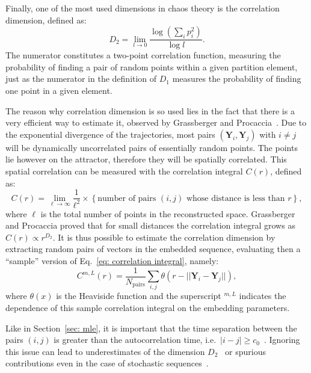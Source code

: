 Finally, one of the most used dimensions in chaos theory is the correlation dimension, defined as:
\begin{equation}
    \label{eq: D_2}
    D_2=\lim_{l\rightarrow0}\frac{\log(\sum_i p_i^2)}{\log l}.
\end{equation}
The numerator constitutes a two-point correlation function, measuring the probability of finding a
pair of random points within a given partition element, just as the numerator in the definition of
$D_1$ measures the probability of finding one point in a given element.

The reason why correlation dimension is so used lies in the fact that there is a very
efficient way to estimate it, observed by Grassberger and Procaccia~\cite{ref:grassberger1983measuring}.
Due to the exponential divergence of the trajectories, most pairs
$(\mathbf{Y}_i,\mathbf{Y}_j)$ with $i\neq j$ will be dynamically uncorrelated
pairs of essentially random points. The points lie however on the attractor, therefore they will be
spatially correlated. This spatial correlation can be measured with the correlation integral
$C(r)$, defined as:
\begin{equation}
    \label{eq: correlation integral}
    C(r) = \lim_{\ell\rightarrow\infty} \frac{1}{\ell^2}\times\left\{
        \text{number of pairs $(i,j)$ whose distance is less than $r$}
    \right\},
\end{equation}
where $\ell$ is the total number of points in the reconstructed space.
Grassberger and Procaccia proved that for small distances the correlation integral grows as
$C(r)\propto r^{D_2}$. It is thus possible to estimate the correlation dimension
by extracting random pairs of vectors in the embedded sequence, evaluating then a ``sample''
version of Eq.~\ref{eq: correlation integral}, namely:
\begin{equation}
    \label{eq: sample correlation integral}
    C^{m,L}(r)=\frac{1}{N_{\text{pairs}}}\sum_{i,j}\theta\left(
        r-||\mathbf{Y}_i-\mathbf{Y}_j||
    \right),
\end{equation}
where $\theta(x)$ is the Heaviside function and the superscript $^{m,L}$ indicates the dependence of this
sample correlation integral on the embedding parameters. 

Like in Section~\ref{sec: mle}, it is important that the time separation between
the pairs $(i,j)$ is greater than the autocorrelation time, i.e.\ $|i-j|\geq c_0$~\cite{ref:theiler1986spurious,ref:albano1995kolmogorov}.
Ignoring this issue can lead to underestimates of the dimension $D_2$~\cite{ref:theiler1986spurious}
or spurious contributions even in the case of stochastic sequences~\cite{ref:osborne1989finite}.

